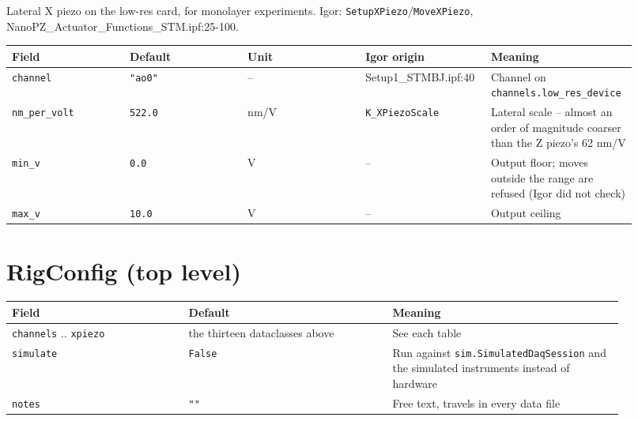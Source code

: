 Lateral X piezo on the low-res card, for monolayer experiments. Igor: \texttt{Setup\discretionary{}{}{}XPiezo}/\texttt{Move\discretionary{}{}{}XPiezo}, NanoPZ\_Actuator\_Functions\_STM.ipf:25-100.

\footnotesize\setlength{\LTleft}{0pt}\setlength{\LTright}{\fill}
\begin{longtable}{@{}>{\raggedright\arraybackslash}p{0.184\linewidth}>{\raggedright\arraybackslash}p{0.184\linewidth}>{\raggedright\arraybackslash}p{0.184\linewidth}>{\raggedright\arraybackslash}p{0.184\linewidth}>{\raggedright\arraybackslash}p{0.184\linewidth}@{}}
\toprule
\textbf{Field} & \textbf{Default} & \textbf{Unit} & \textbf{Igor origin} & \textbf{Meaning} \\
\midrule\endhead
\texttt{channel} & \texttt{"ao0"} & -- & Setup1\_STMBJ.ipf:40 & Channel on \texttt{channels.\discretionary{}{}{}low\_\discretionary{}{}{}res\_\discretionary{}{}{}device} \\
\texttt{nm\_\discretionary{}{}{}per\_\discretionary{}{}{}volt} & \texttt{522.\discretionary{}{}{}0} & nm/V & \texttt{K\_\discretionary{}{}{}XPiezo\discretionary{}{}{}Scale} & Lateral scale -- almost an order of magnitude coarser than the Z piezo's 62 nm/V \\
\texttt{min\_\discretionary{}{}{}v} & \texttt{0.\discretionary{}{}{}0} & V & -- & Output floor; moves outside the range are refused (Igor did not check) \\
\texttt{max\_\discretionary{}{}{}v} & \texttt{10.\discretionary{}{}{}0} & V & -- & Output ceiling \\
\bottomrule
\end{longtable}
\normalsize

\section{RigConfig (top level)}

\small\setlength{\LTleft}{0pt}\setlength{\LTright}{\fill}
\begin{longtable}{@{}>{\raggedright\arraybackslash}p{0.26\linewidth}>{\raggedright\arraybackslash}p{0.30\linewidth}>{\raggedright\arraybackslash}p{0.34\linewidth}@{}}
\toprule
\textbf{Field} & \textbf{Default} & \textbf{Meaning} \\
\midrule\endhead
\texttt{channels} .. \texttt{xpiezo} & the thirteen dataclasses above & See each table \\
\texttt{simulate} & \texttt{False} & Run against \texttt{sim.\discretionary{}{}{}Simulated\discretionary{}{}{}Daq\discretionary{}{}{}Session} and the simulated instruments instead of hardware \\
\texttt{notes} & \texttt{""} & Free text, travels in every data file \\
\bottomrule
\end{longtable}
\normalsize

